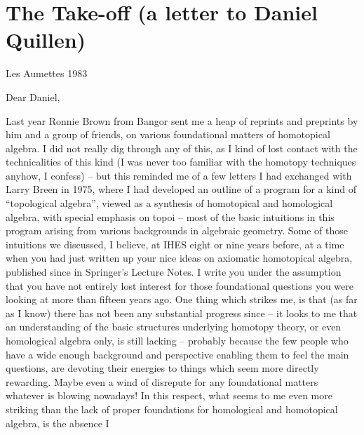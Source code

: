 
\chapter{The Take-off (a letter to Daniel Quillen)}
\label{ch:I}

\par\hfill Les Aumettes 1983\par

Dear Daniel,

\label{sec:1}%
Last year Ronnie Brown from Bangor sent me a heap of reprints and
preprints by him and a group of friends, on various foundational
matters of homotopical algebra. I did not really dig through any of
this, as I kind of lost contact with the technicalities of this kind
(I was never too familiar with the homotopy techniques anyhow, I
confess) -- but this reminded me of a few letters I had exchanged with
Larry Breen in 1975, where I had developed an outline of a program for
a kind of ``topological algebra'', viewed as a synthesis of
homotopical and homological algebra, with special emphasis on topoi --
most of the basic intuitions in this program arising from various
backgrounds in algebraic geometry. Some of those intuitions we
discussed, I believe, at IHES eight or nine years before, at a time
when you had just written up your nice ideas on axiomatic homotopical
algebra, published since in
Springer's Lecture Notes. I write you under the assumption that you
have not entirely lost interest for those foundational questions you
were looking at more than fifteen years ago. One thing which strikes
me, is that (as far as I know) there has not been any substantial
progress since -- it looks to me that an understanding of the basic
structures underlying homotopy theory, or even homological algebra
only, is still lacking -- probably because the few people who have a
wide enough background and perspective enabling them to feel the main
questions, are devoting their energies to things which seem more
directly rewarding. Maybe even a wind of disrepute for any
foundational matters whatever is blowing nowadays!  In this respect,
what seems to me even more striking than the lack of proper
foundations for homological and homotopical algebra, is the absence I
